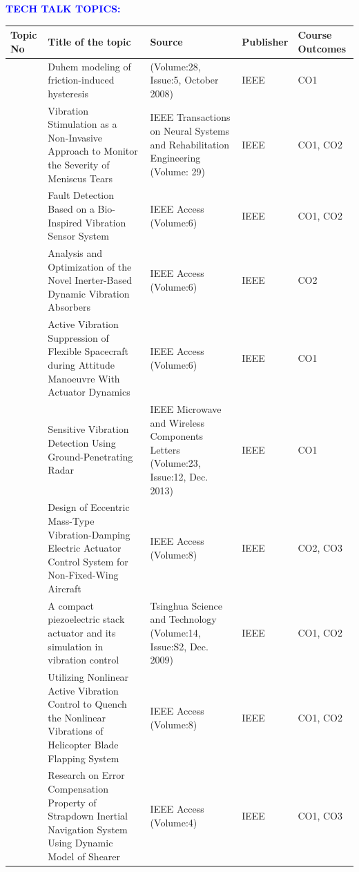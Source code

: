 \documentclass[11pt,paper=a4,answers]{exam}
\begin{document}
\vspace{-1cm}
\flushleft\textbf{\textcolor{blue}{\large TECH TALK TOPICS:}}\\
\vspace{-0.5cm}
	\begin{flushleft}
		\begin{longtable}{|>{\centering\arraybackslash}p{1.4cm}  |  >{\raggedright\arraybackslash}p{6cm} |>{\centering\arraybackslash}p{3.75cm}|>{\centering\arraybackslash}p{2cm} |>{\centering\arraybackslash}p{2cm} |} 
			\hline
			\textbf{Topic No}&	\centering \textbf{Title of the topic}&		\textbf{Source}&		\textbf{Publisher}&		\textbf{Course Outcomes} \\
			\hline 
			
1&Duhem modeling of friction-induced hysteresis&(Volume:28, Issue:5, October 2008)&IEEE&CO1\\\hline
2&Vibration Stimulation as a Non-Invasive Approach to Monitor the Severity of Meniscus Tears&IEEE Transactions on Neural Systems and Rehabilitation Engineering (Volume: 29) & IEEE & CO1, CO2 \\\hline
3&Fault Detection Based on a Bio-Inspired Vibration Sensor System&IEEE Access (Volume:6) &IEEE & CO1, CO2\\\hline
4&Analysis and Optimization of the Novel Inerter-Based Dynamic Vibration Absorbers&IEEE Access (Volume:6)&IEEE&CO2\\\hline
5&Active Vibration Suppression of Flexible Spacecraft during Attitude Manoeuvre With Actuator Dynamics&IEEE Access (Volume:6)&IEEE&CO1\\\hline
6&Sensitive Vibration Detection Using Ground-Penetrating Radar&IEEE Microwave and Wireless Components Letters (Volume:23, Issue:12, Dec. 2013)&IEEE&CO1\\\hline
7&Design of Eccentric Mass-Type Vibration-Damping Electric Actuator Control System for Non-Fixed-Wing Aircraft&IEEE Access (Volume:8)&IEEE&CO2, CO3\\\hline
8&A compact piezoelectric stack actuator and its simulation in vibration control&Tsinghua Science and Technology (Volume:14, Issue:S2, Dec. 2009)&IEEE&CO1, CO2\\\hline
9&Utilizing Nonlinear Active Vibration Control to Quench the Nonlinear Vibrations of Helicopter Blade Flapping System&IEEE Access (Volume:8)&IEEE&CO1, CO2\\\hline
10&Research on Error Compensation Property of Strapdown Inertial Navigation System Using Dynamic Model of Shearer&IEEE Access (Volume:4)&IEEE&CO1, CO3\\\hline

\end{longtable}
\end{flushleft}
\end{document}

